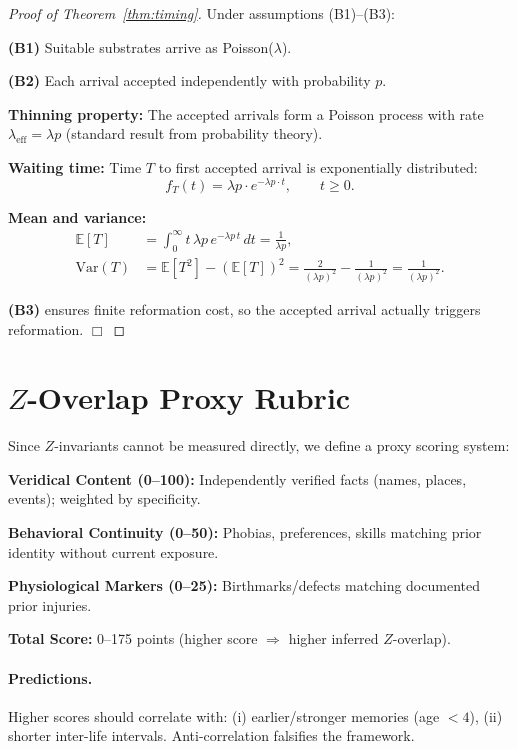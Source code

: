 \documentclass[11pt,letterpaper]{article}
\theoremstyle{definition}
\theoremstyle{remark}
\begin{document}
\begin{proof}[Proof of Theorem~\ref{thm:timing}]
Under assumptions (B1)--(B3):

\textbf{(B1)} Suitable substrates arrive as Poisson(\(\lambda\)).

\textbf{(B2)} Each arrival accepted independently with probability \(p\).

\textbf{Thinning property:} The accepted arrivals form a Poisson process with rate \(\lambda_{\text{eff}}=\lambda p\) (standard result from probability theory).

\textbf{Waiting time:} Time \(T\) to first accepted arrival is exponentially distributed:
\[
f_T(t) = \lambda p \cdot e^{-\lambda p \cdot t},\qquad t\ge 0.
\]

\textbf{Mean and variance:}
\begin{align*}
\mathbb{E}[T] &= \int_0^\infty t\,\lambda p\, e^{-\lambda p\, t}\,dt = \frac{1}{\lambda p},\\
\mathrm{Var}(T) &= \mathbb{E}[T^2] - (\mathbb{E}[T])^2 = \frac{2}{(\lambda p)^2} - \frac{1}{(\lambda p)^2} = \frac{1}{(\lambda p)^2}.
\end{align*}

\textbf{(B3)} ensures finite reformation cost, so the accepted arrival actually triggers reformation. \(\Box\)
\end{proof}

\section{\texorpdfstring{\(Z\)}{Z}-Overlap Proxy Rubric}\label{sec:Z_overlap}

Since \(Z\)-invariants cannot be measured directly, we define a proxy scoring system:

\textbf{Veridical Content (0--100):} Independently verified facts (names, places, events); weighted by specificity.

\textbf{Behavioral Continuity (0--50):} Phobias, preferences, skills matching prior identity without current exposure.

\textbf{Physiological Markers (0--25):} Birthmarks/defects matching documented prior injuries.

\textbf{Total Score:} 0--175 points (higher score \(\Rightarrow\) higher inferred \(Z\)-overlap).

\paragraph{Predictions.}
Higher scores should correlate with: (i) earlier/stronger memories (age \(<4\)), (ii) shorter inter-life intervals. Anti-correlation falsifies the framework.
\end{document}

